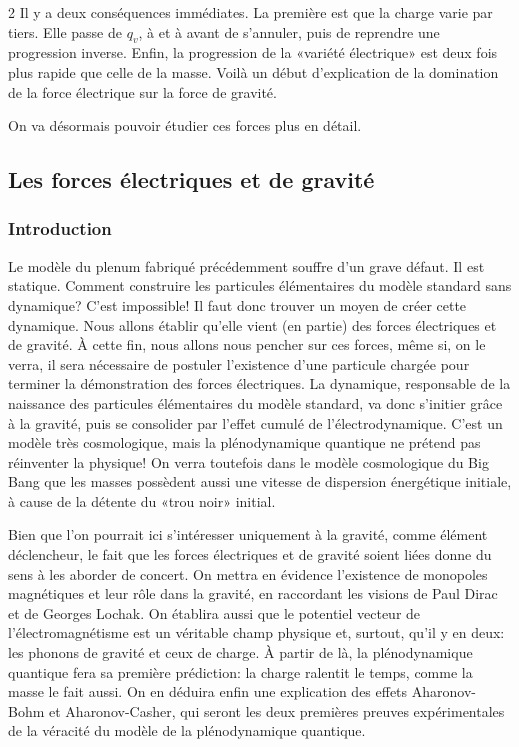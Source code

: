 \begin{multicols}{2}
Il y a deux conséquences immédiates. La première est que la charge
varie par tiers. Elle passe de $q_v$, à  et à  avant de
s'annuler, puis de reprendre une progression inverse. Enfin, la
progression de la «variété électrique» est deux fois plus rapide que
celle de la masse. Voilà un début d'explication de la domination de la
force électrique sur la force de gravité.

On va désormais pouvoir étudier ces forces plus en détail.


\subsection{Les forces électriques et de gravité}

\subsubsection{Introduction}

Le modèle du plenum fabriqué précédemment souffre d'un grave défaut.
Il est statique. Comment construire les particules élémentaires du
modèle standard sans dynamique? C'est impossible! Il faut donc
trouver un moyen de créer cette dynamique. Nous allons établir qu'elle
vient (en partie) des forces électriques et de gravité. À cette fin,
nous allons nous pencher sur ces forces, même si, on le
verra, il sera nécessaire de postuler l'existence d'une particule
chargée pour terminer la démonstration des forces électriques. La
dynamique, responsable de la naissance des particules élémentaires du
modèle standard, va donc s'initier grâce à la gravité, puis se
consolider par l'effet cumulé de l'électrodynamique. C'est un modèle
très cosmologique, mais la plénodynamique quantique ne
prétend pas réinventer la physique! On verra toutefois dans le modèle
cosmologique du Big Bang que les masses possèdent aussi une vitesse de
dispersion énergétique initiale, à cause de la détente du «trou
noir» initial.

Bien que l'on pourrait ici s'intéresser uniquement à la gravité, comme
élément déclencheur, le fait que les forces électriques et de gravité
soient liées donne du sens à les aborder de concert. On mettra en
évidence l'existence de monopoles magnétiques et leur rôle dans la
gravité, en raccordant les visions de Paul Dirac et de Georges Lochak.
On établira aussi que le potentiel vecteur de l'électromagnétisme est
un véritable champ physique et, surtout, qu'il y en deux: les phonons de
gravité et ceux de charge. À partir de là, la plénodynamique quantique fera
sa première prédiction: la charge ralentit le temps, comme la masse
le fait aussi. On en déduira enfin une explication des effets
Aharonov-Bohm et Aharonov-Casher, qui seront les deux premières
preuves expérimentales de la véracité du modèle de la plénodynamique
quantique.


\end{multicols}
